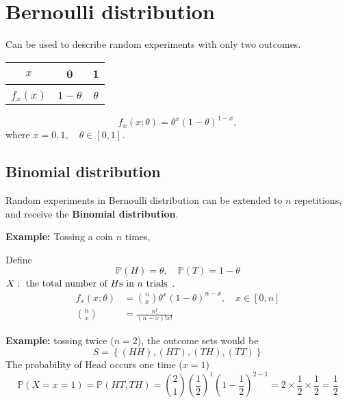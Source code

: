 \documentclass[12pt]{article}
\title{}
\author{}
\date{}
\begin{document}
\section{Bernoulli distribution}
Can be used to describe random experiments with only two outcomes.

\begin{table}[h!]
\begin{center}
\begin{threeparttable}

\begin{tabular}{c|c|c}
$ x $ & 0 & 1 \\
\hline \\[-1.8ex]
$ f_{x}(x) $& $ 1 - \theta $ & $ \theta $
\end{tabular}
\end{threeparttable}
\end{center}
\end{table}


\begin{equation*}
f_{x}(x;\theta) = \theta^{x}(1 - \theta)^{1 - x}, 
\end{equation*}
where $ x = 0,1, \quad \theta \in [0,1] $.





\subsection{Binomial distribution}
Random experiments in Bernoulli distribution can be extended to $ n $ repetitions,
and receive the {\textbf {Binomial distribution}}.

{\textbf {Example:}}
Tossing a coin $ n $ times,

Define
\begin{equation*}
\mathbb{P}(H) = \theta, \quad \mathbb{P}(T) = 1 - \theta
\end{equation*}
$ X: \text{ the total number of $ H $s in $ n $ trials } $.
\begin{align*}
f_{x}(x;\theta)&= \binom{n}{x}\theta^{x}(1 - \theta)^{n - x}, \quad x \in [0,n]\\
\binom{n}{x}&= \frac{n!}{(n - x)!x!}
\end{align*}

{\textbf {Example:}}
tossing twice ($ n = 2 $), the outcome sets would be 
\begin{equation*}
S = \left\{ (HH),(HT),(TH),(TT) \right\} 
\end{equation*}
The probability of Head occurs one time ($ x = 1 $)
\begin{equation*}
\mathbb{P}(X = x = 1) = \mathbb{P}(HT,TH) = \binom{2}{1}(\frac{1}{2})^{1}
(1 - \frac{1}{2})^{2 - 1} = 2  \times \frac{1}{2} \times \frac{1}{2} = \frac{1}{2}
\end{equation*}
















\end{document}
